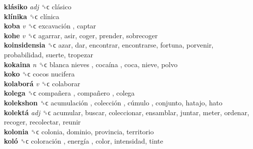 \textbf{klásiko} \emph{adj}  ␝ϲ   clásico   \\
\textbf{klínika} ␝ϲ   clínica   \\
\textbf{koba} \emph{v}  ␝ϲ   excavación , captar  \\
\textbf{kohe} \emph{v}  ␝ϲ  agarrar, asir, coger, prender, sobrecoger  \\
\textbf{koinsidensia} ␝ϲ  azar, dar, encontrar, encontrarse, fortuna, porvenir, probabilidad, suerte, tropezar  \\
\textbf{kokaina} \emph{n}  ␝ϲ   blanca nieves ,  cocaína , coca, nieve, polvo  \\
\textbf{koko} ␝ϲ   cocos nucifera   \\
\textbf{kolaborá} \emph{v}  ␝ϲ  colaborar  \\
\textbf{kolega} ␝ϲ   compañera ,  compañero , colega  \\
\textbf{kolekshon} ␝ϲ   acumulación ,  colección ,  cúmulo , conjunto, hatajo, hato  \\
\textbf{kolektá} \emph{adj}  ␝ϲ  acumular, buscar, coleccionar, ensamblar, juntar, meter, ordenar, recoger, recolectar, reunir  \\
\textbf{kolonia} ␝ϲ  colonia, dominio, provincia, territorio  \\
\textbf{koló} ␝ϲ   coloración ,  energía , color, intensidad, tinte  \\
